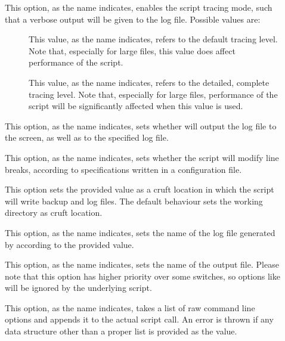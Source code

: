 \begin{description}
\begin{description}
\item[] This option, as the name indicates, enables the script tracing mode, such that a verbose output will be given to the  log file. Possible values are:

\begin{description}
\item[] This value, as the name indicates, refers to the default tracing level. Note that, especially for large files, this value does affect performance of the script.

\item[] This value, as the name indicates, refers to the detailed, complete tracing level. Note that, especially for large files, performance of the script will be significantly affected when this value is used.
\end{description}

\item[] This option, as the name indicates, sets whether  will output the log file to the screen, as well as to the specified log file.

\item[] This option, as the name indicates, sets whether the script will modify line breaks, according to specifications written in a configuration file.

\item[] This option sets the provided value as a cruft location in which the script will write backup and log files. The default behaviour sets the working directory as cruft location.

\item[] This option, as the name indicates, sets the name of the log file generated by  according to the provided value.

\item[] This option, as the name indicates, sets the name of the output file. Please note that this option has higher priority over some switches, so options like  will be ignored by the underlying script.

\item[] This option, as the name indicates, takes a list of raw command line options and appends it to the actual script call. An error is thrown if any data structure other than a proper list is provided as the value.


\end{description}
\end{description}
